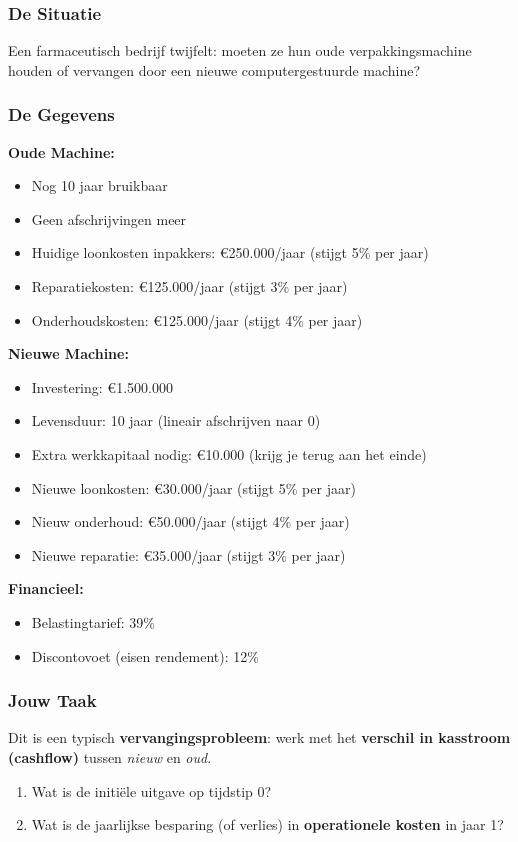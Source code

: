 \documentclass[a4paper,11pt]{article}
\begin{document}
\begin{oefenblok}

    \subsubsection*{De Situatie}
    Een farmaceutisch bedrijf twijfelt: moeten ze hun oude verpakkingsmachine houden of vervangen door een nieuwe computergestuurde machine?

    \subsubsection*{De Gegevens}

    \textbf{Oude Machine:}
    \begin{itemize}
        \item Nog 10 jaar bruikbaar
        \item Geen afschrijvingen meer
        \item Huidige loonkosten inpakkers: €250.000/jaar (stijgt 5\% per jaar)
        \item Reparatiekosten: €125.000/jaar (stijgt 3\% per jaar)
        \item Onderhoudskosten: €125.000/jaar (stijgt 4\% per jaar)
    \end{itemize}

    \textbf{Nieuwe Machine:}
    \begin{itemize}
        \item Investering: €1.500.000
        \item Levensduur: 10 jaar (lineair afschrijven naar 0)
        \item Extra werkkapitaal nodig: €10.000 (krijg je terug aan het einde)
        \item Nieuwe loonkosten: €30.000/jaar (stijgt 5\% per jaar)
        \item Nieuw onderhoud: €50.000/jaar (stijgt 4\% per jaar)
        \item Nieuwe reparatie: €35.000/jaar (stijgt 3\% per jaar)
    \end{itemize}

    \textbf{Financieel:}
    \begin{itemize}
        \item Belastingtarief: 39\%
        \item Discontovoet (eisen rendement): 12\%
    \end{itemize}

    \subsubsection*{Jouw Taak}
    Dit is een typisch \textbf{vervangingsprobleem}:
    werk met het \textbf{verschil in kasstroom (cashflow)} tussen \textit{nieuw} en \textit{oud}.
    \begin{enumerate}
        \item Wat is de initiële uitgave op tijdstip 0?
        \item Wat is de jaarlijkse besparing (of verlies) in \textbf{operationele kosten} in jaar 1?
    \end{enumerate}


\end{oefenblok}
\end{document}
